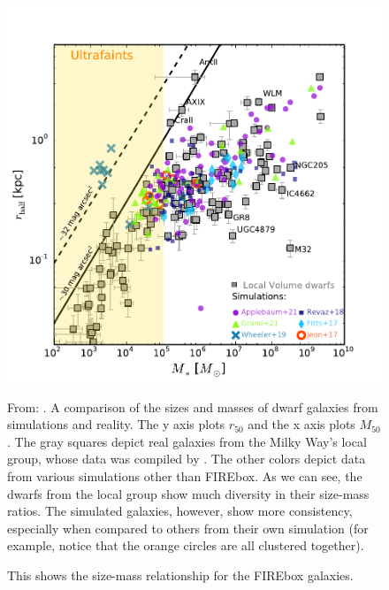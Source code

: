 \begin{figure}
    \includegraphics*[width=\textwidth]{figs/sales/fig4.pdf}
    \label{fig:sales-size-mass}
    \caption{
        From: \cite{salesBaryonicSolutionsChallenges2022}. A comparison of the sizes and masses of dwarf galaxies from simulations and reality. The y axis plots $r_{50}$ and the x axis plots $M_{50}$. The gray squares depict real galaxies from the Milky Way's local group, whose data was compiled by \cite{mcconnachieOBSERVEDPROPERTIESDWARF2012}. The other colors depict data from various simulations other than FIREbox. As we can see, the dwarfs from the local group show much diversity in their size-mass ratios. The simulated galaxies, however, show more consistency, especially when compared to others from their own simulation (for example, notice that the orange circles are all clustered together).
    }
\end{figure}

\begin{figure}
    \centering
    
    \caption{This shows the size-mass relationship for the FIREbox galaxies. }
    \label{fig:size-mass}
\end{figure}

